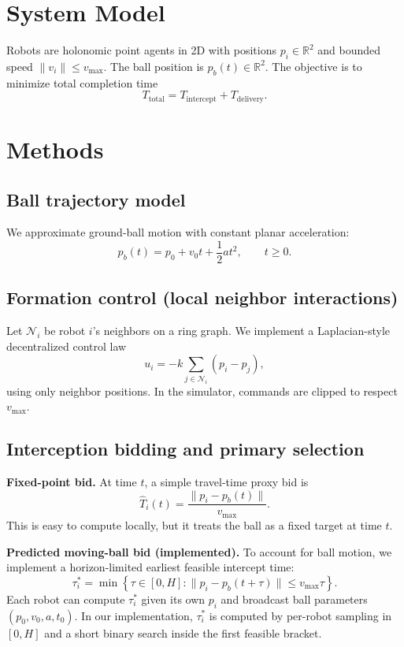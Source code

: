 \documentclass[conference]{IEEEtran}
\begin{document}
\section{System Model}
Robots are holonomic point agents in 2D with positions \(p_i \in \mathbb{R}^2\) and bounded speed \(\|v_i\|\le v_{\max}\). The ball position is \(p_b(t)\in\mathbb{R}^2\). The objective is to minimize total completion time
\[
T_{\mathrm{total}} = T_{\mathrm{intercept}} + T_{\mathrm{delivery}}.
\]

\section{Methods}
\subsection{Ball trajectory model}
We approximate ground-ball motion with constant planar acceleration:
\begin{equation}
p_b(t) = p_0 + v_0 t + \frac{1}{2} a t^2, \qquad t \ge 0.
\end{equation}

\subsection{Formation control (local neighbor interactions)}
Let \(\mathcal{N}_i\) be robot \(i\)'s neighbors on a ring graph. We implement a Laplacian-style decentralized control law
\begin{equation}
u_i = -k \sum_{j \in \mathcal{N}_i} (p_i - p_j),
\label{eq:formation-law}
\end{equation}
using only neighbor positions. In the simulator, commands are clipped to respect \(v_{\max}\).

\subsection{Interception bidding and primary selection}
\textbf{Fixed-point bid.} At time \(t\), a simple travel-time proxy bid is
\begin{equation}
\widehat{T}_i(t) = \frac{\|p_i - p_b(t)\|}{v_{\max}}.
\label{eq:Ti-hat}
\end{equation}
\noindent This is easy to compute locally, but it treats the ball as a fixed target at time \(t\).

\textbf{Predicted moving-ball bid (implemented).} To account for ball motion, we implement a horizon-limited earliest feasible intercept time:
\begin{equation}
\tau_i^\ast = \min \left\{ \tau \in [0,H] : \|p_i - p_b(t+\tau)\| \le v_{\max}\tau \right\}.
\label{eq:pred-bid}
\end{equation}
Each robot can compute \(\tau_i^\ast\) given its own \(p_i\) and broadcast ball parameters \((p_0,v_0,a,t_0)\). In our implementation, \(\tau_i^\ast\) is computed by per-robot sampling in \([0,H]\) and a short binary search inside the first feasible bracket.
\end{document}
